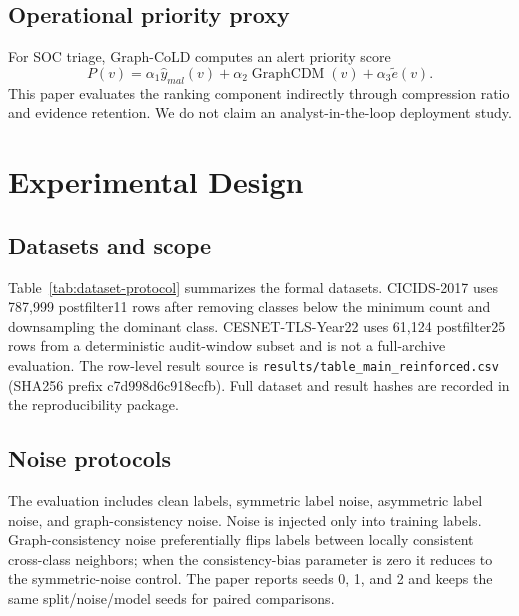 \documentclass[preprint,review,12pt]{elsarticle}
\begin{document}
\subsection{Operational priority proxy}
For SOC triage, Graph-CoLD computes an alert priority score
\begin{equation}
P(v)=\alpha_1\hat y_{mal}(v)+\alpha_2\operatorname{GraphCDM}(v)+\alpha_3\tilde e(v).
\end{equation}
This paper evaluates the ranking component indirectly through compression ratio
and evidence retention. We do not claim an analyst-in-the-loop deployment study.

\section{Experimental Design}
\subsection{Datasets and scope}
Table~\ref{tab:dataset-protocol} summarizes the formal datasets. CICIDS-2017
uses 787,999 postfilter11 rows
after removing classes below the minimum count and downsampling the dominant
class. CESNET-TLS-Year22 uses 61,124
postfilter25 rows from a deterministic audit-window subset and is not a full-archive evaluation. The row-level result
source is \texttt{results/table\_main\_reinforced.csv} (SHA256 prefix
c7d998d6c918ecfb). Full dataset and result hashes are recorded in the
reproducibility package.

\begin{table}[t]
\centering
\caption{Verified real-data protocols. CESNET-TLS-Year22 is an audit-window subset and not a full-archive evaluation.}
\label{tab:dataset-protocol}
\resizebox{\textwidth}{!}{}
\end{table}

\subsection{Noise protocols}
The evaluation includes clean labels, symmetric label noise, asymmetric label
noise, and graph-consistency noise. Noise is injected only into training labels.
Graph-consistency noise preferentially flips labels between locally consistent
cross-class neighbors; when the consistency-bias parameter is zero it reduces to
the symmetric-noise control. The paper reports seeds 0, 1, and 2 and keeps the
same split/noise/model seeds for paired comparisons.
\end{document}
